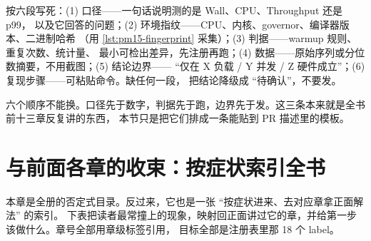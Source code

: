 \documentclass[12pt,a4paper,fontset=fandol]{ctexbook}
\newcommand{\Lang}[1]{\textsf{#1}}
\newcommand{\MWall}{\Lang{Wall}}
\newcommand{\MCpu}{\Lang{CPU}}
\newcommand{\MThr}{\Lang{Throughput}}
\newcommand{\Mx}[1]{\textsf{#1}}
\begin{document}
\begin{bestpractice}[title={能活的结论模板}]
按六段写死：(1) 口径——一句话说明测的是 \MWall{}、\MCpu{}、\MThr{} 还是 \Mx{p99}，
以及它回答的问题；(2) 环境指纹——CPU、内核、governor、编译器版本、二进制哈希
（用 \ref{lst:pm15-fingerprint} 采集）；(3) 判据——warmup 规则、重复次数、统计量、
最小可检出差异，先注册再跑；(4) 数据——原始序列或分位数摘要，不用截图；(5) 结论边界——
``仅在 X 负载 / Y 并发 / Z 硬件成立''；(6) 复现步骤——可粘贴命令。缺任何一段，
把结论降级成 ``待确认''，不要发。
\end{bestpractice}

六个顺序不能换。口径先于数字，判据先于跑，边界先于发。这三条本来就是全书前十三章反复讲的东西，
本节只是把它们排成一条能贴到 PR 描述里的模板。

\section{与前面各章的收束：按症状索引全书}

本章是全册的否定式目录。反过来，它也是一张 ``按症状进来、去对应章拿正面解法'' 的索引。
下表把读者最常撞上的现象，映射回正面讲过它的章，并给第一步该做什么。章号全部用章级标签引用，
目标全部是注册表里那 18 个 label。
\end{document}
